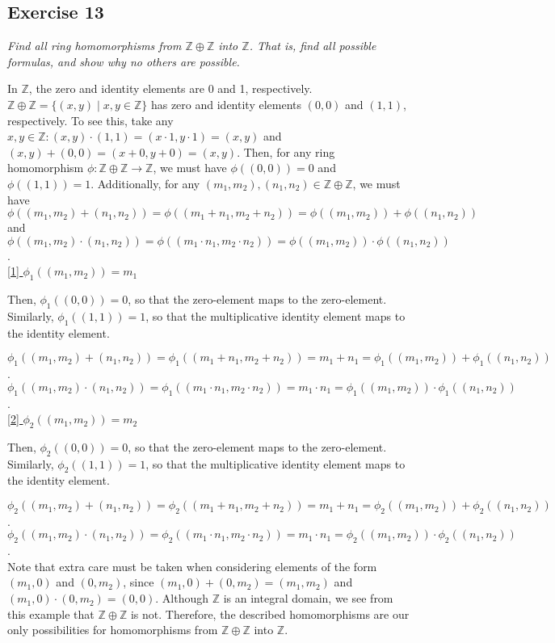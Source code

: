 \subsection*{Exercise 13}
\textit{Find all ring homomorphisms from $\mathbb{Z}\oplus\mathbb{Z}$ into $\mathbb{Z}$. That is, find all possible formulas, and show why no others are possible.}

\vspace{5 mm}
In $\mathbb{Z}$, the zero and identity elements are 0 and 1, respectively. $\mathbb{Z}\oplus\mathbb{Z} = \{(x,y) \mid x,y \in \mathbb{Z} \}$ has zero and identity elements $(0,0)$ and $(1,1)$, respectively. To see this, take any $x,y \in \mathbb{Z}: (x,y)\cdot(1,1) = (x\cdot1,y\cdot1) = (x,y)$ and $(x,y)+(0,0) = (x+0,y+0) = (x,y)$. Then, for any ring homomorphism $\phi: \mathbb{Z}\oplus\mathbb{Z} \rightarrow \mathbb{Z}$, we must have $\phi((0,0)) = 0$ and $\phi((1,1)) = 1$. Additionally, for any $(m_1,m_2), (n_1,n_2) \in \mathbb{Z}\oplus\mathbb{Z}$, we must have $\phi((m_1,m_2) + (n_1,n_2)) = \phi((m_1 + n_1,m_2 + n_2)) = \phi((m_1,m_2)) + \phi((n_1,n_2))$ and $\phi((m_1,m_2) \cdot (n_1,n_2)) = \phi((m_1 \cdot n_1,m_2 \cdot n_2)) = \phi((m_1,m_2)) \cdot \phi((n_1,n_2))$. \\

\underline{[1] $\phi_1((m_1,m_2)) = m_1$}

Then, $\phi_1((0,0)) = 0$, so that the zero-element maps to the zero-element. Similarly, $\phi_1((1,1)) = 1$, so that the multiplicative identity element maps to the identity element.

$\phi_1((m_1,m_2) + (n_1,n_2)) = \phi_1((m_1 + n_1,m_2 + n_2)) = m_1 + n_1 = \phi_1((m_1,m_2)) + \phi_1((n_1,n_2))$. \\
$\phi_1((m_1,m_2) \cdot (n_1,n_2)) = \phi_1((m_1 \cdot n_1,m_2 \cdot n_2)) = m_1 \cdot n_1 = \phi_1((m_1,m_2)) \cdot \phi_1((n_1,n_2))$. \\

\underline{[2] $\phi_2((m_1,m_2)) = m_2$}

Then, $\phi_2((0,0)) = 0$, so that the zero-element maps to the zero-element. Similarly, $\phi_2((1,1)) = 1$, so that the multiplicative identity element maps to the identity element.

$\phi_2((m_1,m_2) + (n_1,n_2)) = \phi_2((m_1 + n_1,m_2 + n_2)) = m_1 + n_1 = \phi_2((m_1,m_2)) + \phi_2((n_1,n_2))$. \\
$\phi_2((m_1,m_2) \cdot (n_1,n_2)) = \phi_2((m_1 \cdot n_1,m_2 \cdot n_2)) = m_1 \cdot n_1 = \phi_2((m_1,m_2)) \cdot \phi_2((n_1,n_2))$. \\

Note that extra care must be taken when considering elements of the form $(m_1,0)$ and $(0,m_2)$, since $(m_1,0) + (0,m_2) = (m_1,m_2)$ and $(m_1,0) \cdot (0,m_2) = (0,0)$. Although $\mathbb{Z}$ is an integral domain, we see from this example that $\mathbb{Z}\oplus \mathbb{Z}$ is not. Therefore, the described homomorphisms are our only possibilities for homomorphisms from $\mathbb{Z}\oplus\mathbb{Z}$ into $\mathbb{Z}$.
